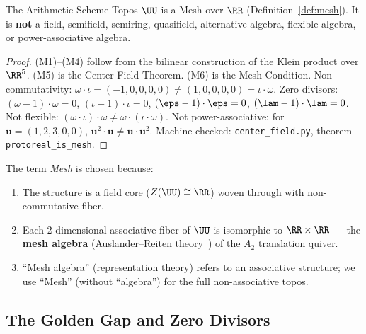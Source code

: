 \begin{theorem}[$\UU$ is a Mesh]{\label{thm:mesh}}
The Arithmetic Scheme Topos $\UU$ is a Mesh over $\RR$ (Definition~\ref{def:mesh}). It is \textbf{not} a field, semifield, semiring, quasifield, alternative algebra, flexible algebra, or power-associative algebra.
\end{theorem}

\begin{proof}
(M1)--(M4) follow from the bilinear construction of the Klein product over $\RR^5$. (M5) is the Center-Field Theorem. (M6) is the Mesh Condition. Non-commutativity: $\omega \cdot \iota = (-1, 0, 0, 0, 0) \neq (1, 0, 0, 0, 0) = \iota \cdot \omega$. Zero divisors: $(\omega - 1) \cdot \omega = 0$, $(\iota + 1) \cdot \iota = 0$, $(\eps - 1) \cdot \eps = 0$, $(\lam - 1) \cdot \lam = 0$. Not flexible: $(\omega \cdot \iota) \cdot \omega \neq \omega \cdot (\iota \cdot \omega)$. Not power-associative: for $\mathbf{u} = (1, 2, 3, 0, 0)$, $\mathbf{u}^2 \cdot \mathbf{u} \neq \mathbf{u} \cdot \mathbf{u}^2$. Machine-checked: \texttt{center\_field.py}, theorem \texttt{protoreal\_is\_mesh}. \qedhere
\end{proof}

\begin{remark}
The term \emph{Mesh} is chosen because:
\begin{enumerate}[noitemsep]
\item The structure is a field core ($Z(\UU) \cong \RR$) woven through with non-commutative fiber.
\item Each 2-dimensional associative fiber of $\UU$ is isomorphic to $\RR \times \RR$ --- the \textbf{mesh algebra} (Auslander--Reiten theory~\cite{assem-simson-skowronski}) of the $A_2$ translation quiver.
\item ``Mesh algebra'' (representation theory) refers to an associative structure; we use ``Mesh'' (without ``algebra'') for the full non-associative topos.
\end{enumerate}
\end{remark}


\subsection{The Golden Gap and Zero Divisors}\label{sec:golden-gap}

